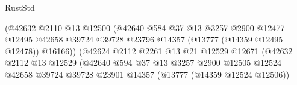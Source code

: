 \begin{lexlean}{RustStd}
\begin{coremodule}
                                                (@42632
                                                  @2110
                                                  @13
                                                  @12500
                                                  (@42640
                                                    @584
                                                    @37
                                                    @13
                                                    @3257
                                                    @2900
                                                    @12477
                                                    @12495
                                                    @42658
                                                    @39724
                                                    @39728
                                                    @23796
                                                    @14357
                                                    (@13777 (@14359 @12495 @12478))
                                                    @16166))
                                                (@42624
                                                  @2112
                                                  @2261
                                                  @13
                                                  @21
                                                  @12529
                                                  @12671
                                                  (@42632
                                                    @2112
                                                    @13
                                                    @12529
                                                    (@42640
                                                      @594
                                                      @37
                                                      @13
                                                      @3257
                                                      @2900
                                                      @12505
                                                      @12524
                                                      @42658
                                                      @39724
                                                      @39728
                                                      @23901
                                                      @14357
                                                      (@13777 (@14359 @12524 @12506))

\end{coremodule}
\end{lexlean}

